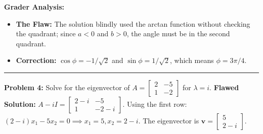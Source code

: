 \documentclass[11pt, letterpaper]{article}
\theoremstyle{definition}
\theoremstyle{remark}
\begin{document}
\textbf{Grader Analysis:}
\begin{itemize}
    \item \textbf{The Flaw:} The solution blindly used the arctan function without checking the quadrant; since $a < 0$ and $b > 0$, the angle must be in the second quadrant.
    \item \textbf{Correction:} $\cos\phi = -1/\sqrt{2}$ and $\sin\phi = 1/\sqrt{2}$, which means $\phi = 3\pi/4$.
\end{itemize}

\vspace{1em}
\hrule
\vspace{1em}

\textbf{Problem 4:} Solve for the eigenvector of $A = \begin{bmatrix} 2 & -5 \\ 1 & -2 \end{bmatrix}$ for $\lambda = i$.
\newline
\textbf{Flawed Solution:}
$A - iI = \begin{bmatrix} 2 - i & -5 \\ 1 & -2 - i \end{bmatrix}$.
Using the first row: $(2 - i)x_1 - 5x_2 = 0 \implies x_1 = 5, x_2 = 2 - i$.
The eigenvector is $\mathbf{v} = \begin{bmatrix} 5 \\ 2 - i \end{bmatrix}$.
\end{document}
